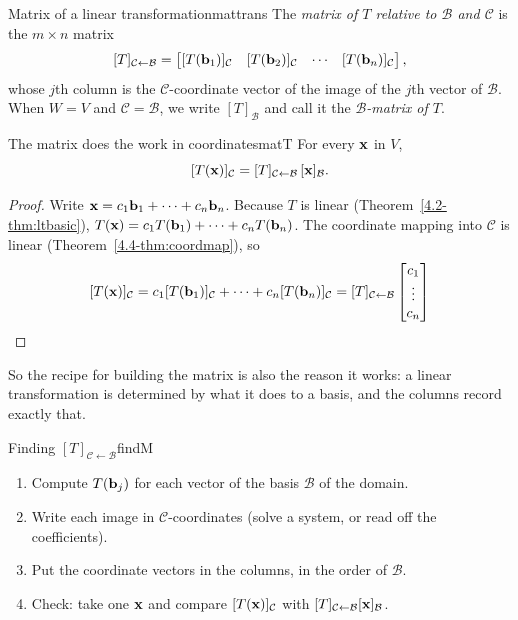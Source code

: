 \documentclass[11pt]{article}
\begin{document}
\begin{defn}{Matrix of a linear transformation}{mattrans}
The \emph{matrix of $T$ relative to $\mathcal{B}$ and $\mathcal{C}$} is the $m\times n$ matrix
\[
[T]_{\mathcal{C}\leftarrow\mathcal{B}}=\begin{bmatrix}[T(\mathbf{b}_1)]_{\mathcal{C}}&[T(\mathbf{b}_2)]_{\mathcal{C}}&\cdots&[T(\mathbf{b}_n)]_{\mathcal{C}}\end{bmatrix},
\]
whose $j$th column is the $\mathcal{C}$-coordinate vector of the image of the $j$th vector of $\mathcal{B}$. When $W=V$ and $\mathcal{C}=\mathcal{B}$, we write $[T]_{\mathcal{B}}$ and call it the \emph{$\mathcal{B}$-matrix of $T$}.
\end{defn}

\begin{thm}{The matrix does the work in coordinates}{matT}
For every $\mathbf{x}$ in $V$,
\[
[T(\mathbf{x})]_{\mathcal{C}}=[T]_{\mathcal{C}\leftarrow\mathcal{B}}\,[\mathbf{x}]_{\mathcal{B}}.
\]
\end{thm}

\begin{proof}
Write $\mathbf{x}=c_1\mathbf{b}_1+\cdots+c_n\mathbf{b}_n$. Because $T$ is linear (Theorem~\ref{4.2-thm:ltbasic}), $T(\mathbf{x})=c_1T(\mathbf{b}_1)+\cdots+c_nT(\mathbf{b}_n)$. The coordinate mapping into $\mathcal{C}$ is linear (Theorem~\ref{4.4-thm:coordmap}), so
\[
[T(\mathbf{x})]_{\mathcal{C}}=c_1[T(\mathbf{b}_1)]_{\mathcal{C}}+\cdots+c_n[T(\mathbf{b}_n)]_{\mathcal{C}}=[T]_{\mathcal{C}\leftarrow\mathcal{B}}\begin{bmatrix}c_1\\\vdots\\c_n\end{bmatrix}
\]
\end{proof}

So the recipe for building the matrix is also the reason it works: a linear transformation is determined by what it does to a basis, and the columns record exactly that.

\begin{proc}{Finding $[T]_{\mathcal{C}\leftarrow\mathcal{B}}$}{findM}
\begin{enumerate}[nosep]
  \item Compute $T(\mathbf{b}_j)$ for each vector of the basis $\mathcal{B}$ of the domain.
  \item Write each image in $\mathcal{C}$-coordinates (solve a system, or read off the coefficients).
  \item Put the coordinate vectors in the columns, in the order of $\mathcal{B}$.
  \item Check: take one $\mathbf{x}$ and compare $[T(\mathbf{x})]_{\mathcal{C}}$ with $[T]_{\mathcal{C}\leftarrow\mathcal{B}}[\mathbf{x}]_{\mathcal{B}}$.
\end{enumerate}
\end{proc}
\end{document}
